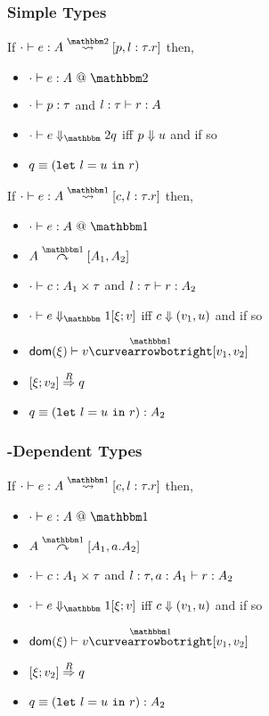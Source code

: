 \subsubsection{Simple Types}

\begin{theorem}
If $\cdot\vdash e : A \splittwosym [p,l:\tau.r]$ then,
\begin{itemize}
\item $\cdot \vdash e : A~@~\bbtwo$ 
\item $\types [\cdot] p \tau$ and $\types [l:\tau] r A$ 
\item $\diatwo [\cdot] e q$ iff $\reduce p u$ and if so
\item $q \equiv (\letin{l}{u}{r})$
\end{itemize}
\end{theorem}

\begin{theorem}
If $\cdot\vdash e : A \splitonesym [c,l:\tau.r]$ then,
\begin{itemize}
\item $\typesone [\cdot] e A$ 
\item $A \tsplito [A_1,A_2]$
\item $\types [\cdot] c {A_1 \times \tau}$ and $\types [l:\tau] r A_2$ 
\item $\diaone [\cdot] e {\xi;v}$ iff $\reduce c {(v_1,u)}$ and if so
\item $\dom \xi \vdash v \vsplito [v_1,v_2]$
\item $\reify \xi {v_2} q$
\item $q \equiv (\letin{l}{u}{r}) : A_2$
\end{itemize}
\end{theorem}

\subsubsection{\bbone-Dependent Types}
\begin{theorem}
If $\cdot\vdash e : A \splitonesym [c,l:\tau.r]$ then,
\begin{itemize}
\item $\typesone [\cdot] e A$ 
\item $A \tsplito [A_1,a.A_2]$
\item $\types [\cdot] c {A_1 \times \tau}$ and $\types [l:\tau,a:A_1] r A_2$ 
\item $\diaone [\cdot] e {\xi;v}$ iff $\reduce c {(v_1,u)}$ and if so
\item $\dom \xi \vdash v \vsplito [v_1,v_2]$
\item $\reify \xi {v_2} q$
\item $q \equiv (\letin{l}{u}{r}) : A_2$
\end{itemize}
\end{theorem}

